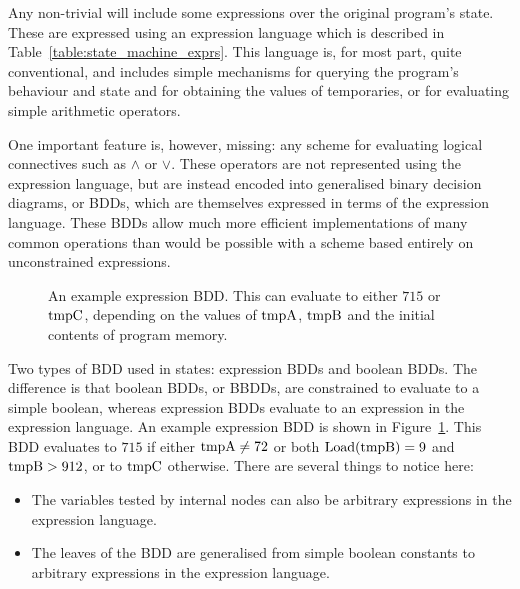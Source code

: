 Any non-trivial {\StateMachine} will include some expressions over the
original program's state.  These are expressed using an expression
language which is described in Table~\ref{table:state_machine_exprs}.
This language is, for most part, quite conventional, and includes
simple mechanisms for querying the program's behaviour and state and
for obtaining the values of {\StateMachine} temporaries, or for
evaluating simple arithmetic operators.

One important feature is, however, missing: any scheme for evaluating
logical connectives such as $\wedge$ or $\vee$.  These operators are
not represented using the expression language, but are instead encoded
into generalised binary decision diagrams, or BDDs, which are
themselves expressed in terms of the expression language.  These BDDs
allow much more efficient implementations of many common operations
than would be possible with a scheme based entirely on unconstrained
expressions.

\begin{figure}
  \caption{An example expression BDD.  This can evaluate to either
    $715$ or $\mathrm{tmpC}$, depending on the values of $\mathrm{tmpA}$,
    $\mathrm{tmpB}$ and the initial contents of program memory.}
  \label{fig:derive:example_expr_bdd}
\end{figure}

Two types of BDD used in {\StateMachine} states: expression BDDs and
boolean BDDs.  The difference is that boolean BDDs, or BBDDs, are
constrained to evaluate to a simple boolean, whereas expression BDDs
evaluate to an expression in the expression language.  An example
expression BDD is shown in Figure~\ref{fig:derive:example_expr_bdd}.
This BDD evaluates to $715$ if either $\mathrm{tmpA} \not= 72$ or both
$\mathrm{Load}(\mathrm{tmpB}) = 9$ and $\mathrm{tmpB} > 912$, or to $\mathrm{tmpC}$
otherwise.  There are several things to notice here:

\begin{itemize}
\item The variables tested by internal nodes can also be arbitrary
  expressions in the expression language.
\item The leaves of the BDD are generalised from simple boolean
  constants to arbitrary expressions in the expression language.
\end{itemize}

